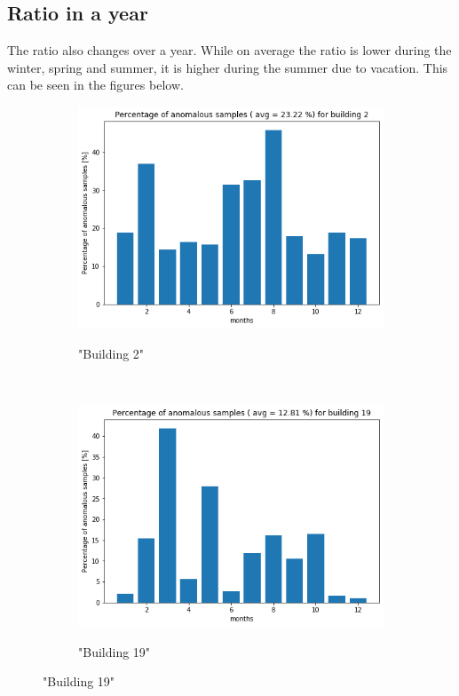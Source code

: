 \subsection{Ratio in a year}

The ratio also changes over a year. While on average the ratio is lower during the winter, spring and summer, it is higher during the summer due to vacation. 
This can be seen in the figures below. 

\begin{figure}[H]
	\begin{subfigure}{.5\textwidth}
		\caption{"Building 2"}
		\includegraphics[width=1\linewidth]{../Figures/EC/b2year.png}
		\label{fig:ec_b2year}
	\end{subfigure}%
	~ 
	\begin{subfigure}{.5\textwidth}
		\caption{"Building 19"}
		\includegraphics[width=1\linewidth]{../Figures/EC/b19year.png}
		\label{fig:ec_b5year}
	\end{subfigure}%
    \bigskip


\end{figure}
